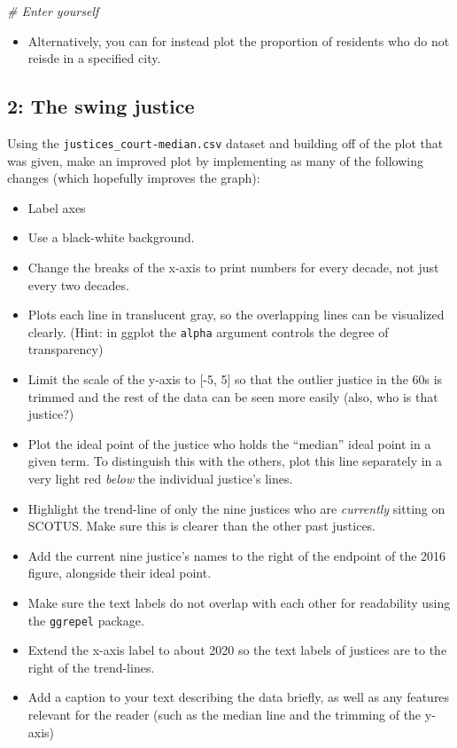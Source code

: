 \documentclass[]{book}
\newenvironment{Shaded}{\begin{snugshade}}{\end{snugshade}}
\newcommand{\CommentTok}[1]{\textcolor[rgb]{0.56,0.35,0.01}{\textit{#1}}}
\providecommand{\tightlist}{%
  \setlength{\itemsep}{0pt}\setlength{\parskip}{0pt}}
\theoremstyle{definition}
\theoremstyle{definition}
\theoremstyle{definition}
\theoremstyle{remark}
\begin{document}
\begin{Shaded}
\begin{Highlighting}[]
\CommentTok{# Enter yourself}
\end{Highlighting}
\end{Shaded}

\begin{itemize}
\tightlist
\item
  Alternatively, you can for instead plot the proportion of residents who do not reisde in a specified city.
\end{itemize}

\hypertarget{the-swing-justice}{%
\subsection*{2: The swing justice}\label{the-swing-justice}}

Using the \texttt{justices\_court-median.csv} dataset and building off of the plot that was given, make an improved plot by implementing as many of the following changes (which hopefully improves the graph):

\begin{itemize}
\tightlist
\item
  Label axes
\item
  Use a black-white background.
\item
  Change the breaks of the x-axis to print numbers for every decade, not just every two decades.
\item
  Plots each line in translucent gray, so the overlapping lines can be visualized clearly. (Hint: in ggplot the \texttt{alpha} argument controls the degree of transparency)
\item
  Limit the scale of the y-axis to {[}-5, 5{]} so that the outlier justice in the 60s is trimmed and the rest of the data can be seen more easily (also, who is that justice?)
\item
  Plot the ideal point of the justice who holds the ``median'' ideal point in a given term. To distinguish this with the others, plot this line separately in a very light red \emph{below} the individual justice's lines.
\item
  Highlight the trend-line of only the nine justices who are \emph{currently} sitting on SCOTUS. Make sure this is clearer than the other past justices.
\item
  Add the current nine justice's names to the right of the endpoint of the 2016 figure, alongside their ideal point.
\item
  Make sure the text labels do not overlap with each other for readability using the \texttt{ggrepel} package.
\item
  Extend the x-axis label to about 2020 so the text labels of justices are to the right of the trend-lines.
\item
  Add a caption to your text describing the data briefly, as well as any features relevant for the reader (such as the median line and the trimming of the y-axis)
\end{itemize}
\end{document}
